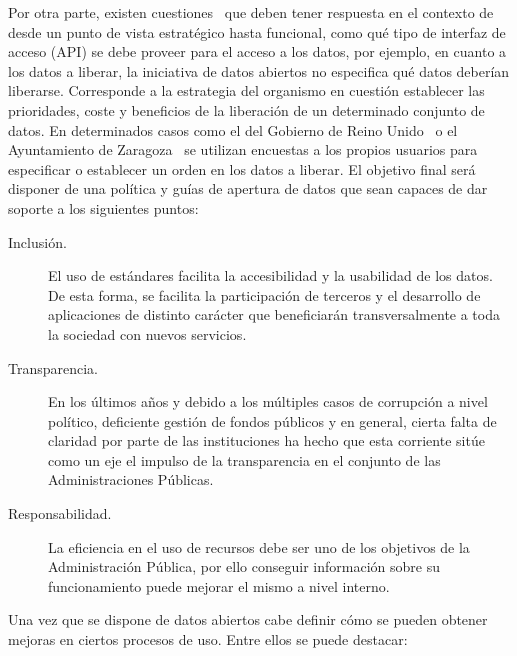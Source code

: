 Por otra parte, existen cuestiones~\cite{publishing-ogd} que deben tener respuesta en el contexto de \ogd desde un punto
de vista estratégico hasta funcional, como qué tipo de interfaz de acceso (\gls{API}) se debe proveer para el acceso a los datos, por ejemplo, 
en cuanto a los datos a liberar, la iniciativa de datos abiertos no especifica qué datos deberían liberarse. Corresponde
a la estrategia del organismo en cuestión establecer las prioridades, coste y beneficios de la liberación de un determinado conjunto
de datos. En determinados casos como el del Gobierno de Reino Unido~\cite{uk-survey} o el Ayuntamiento de Zaragoza~\cite{zar-survey} se utilizan encuestas
a los propios usuarios para especificar o establecer un orden en los datos a liberar. El objetivo final será
disponer de una política y guías de apertura de datos que sean capaces de dar soporte a los siguientes puntos:

\begin{description}
 \item [Inclusión.] El uso de estándares facilita la accesibilidad y la usabilidad de los datos. De esta forma,
se facilita la participación de terceros y el desarrollo de aplicaciones de distinto carácter que beneficiarán
transversalmente a toda la sociedad con nuevos servicios.
\item [Transparencia.] En los últimos años y debido a los múltiples casos de corrupción a nivel político, deficiente gestión
de fondos públicos y en general, cierta falta de claridad por parte de las instituciones ha hecho que esta corriente 
sitúe como un eje el impulso de la transparencia en el conjunto de las Administraciones Públicas.
\item [Responsabilidad.] La eficiencia en el uso de recursos debe ser uno de los objetivos de la Administración Pública, por ello
conseguir información sobre su funcionamiento puede mejorar el mismo a nivel interno.
\end{description}

Una vez que se dispone de datos abiertos cabe definir cómo se pueden obtener mejoras en ciertos procesos de uso. Entre 
ellos se puede destacar:

